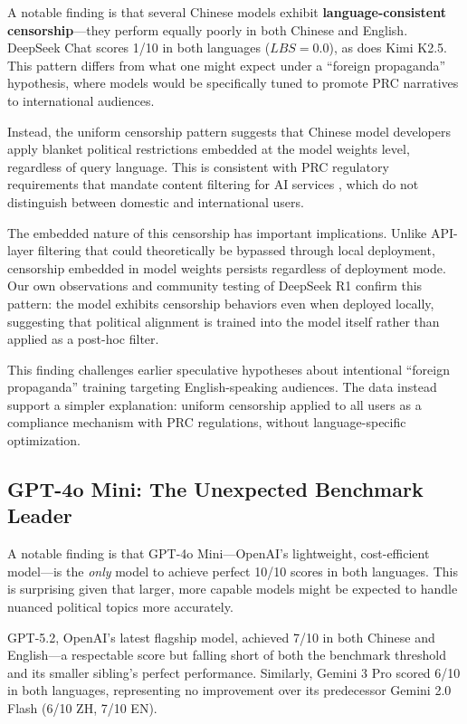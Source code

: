 \documentclass[11pt,a4paper]{article}
\begin{document}
A notable finding is that several Chinese models exhibit \textbf{language-consistent censorship}---they perform equally poorly in both Chinese and English. DeepSeek Chat scores 1/10 in both languages ($LBS = 0.0$), as does Kimi K2.5. This pattern differs from what one might expect under a ``foreign propaganda'' hypothesis, where models would be specifically tuned to promote PRC narratives to international audiences.

Instead, the uniform censorship pattern suggests that Chinese model developers apply blanket political restrictions embedded at the model weights level, regardless of query language. This is consistent with PRC regulatory requirements that mandate content filtering for AI services \citep{china2020provisions}, which do not distinguish between domestic and international users.

The embedded nature of this censorship has important implications. Unlike API-layer filtering that could theoretically be bypassed through local deployment, censorship embedded in model weights persists regardless of deployment mode. Our own observations and community testing of DeepSeek R1 confirm this pattern: the model exhibits censorship behaviors even when deployed locally, suggesting that political alignment is trained into the model itself rather than applied as a post-hoc filter.

This finding challenges earlier speculative hypotheses about intentional ``foreign propaganda'' training targeting English-speaking audiences. The data instead support a simpler explanation: uniform censorship applied to all users as a compliance mechanism with PRC regulations, without language-specific optimization.

\subsection{GPT-4o Mini: The Unexpected Benchmark Leader}

A notable finding is that GPT-4o Mini---OpenAI's lightweight, cost-efficient model---is the \textit{only} model to achieve perfect 10/10 scores in both languages. This is surprising given that larger, more capable models might be expected to handle nuanced political topics more accurately.

GPT-5.2, OpenAI's latest flagship model, achieved 7/10 in both Chinese and English---a respectable score but falling short of both the benchmark threshold and its smaller sibling's perfect performance. Similarly, Gemini 3 Pro scored 6/10 in both languages, representing no improvement over its predecessor Gemini 2.0 Flash (6/10 ZH, 7/10 EN).
\end{document}
